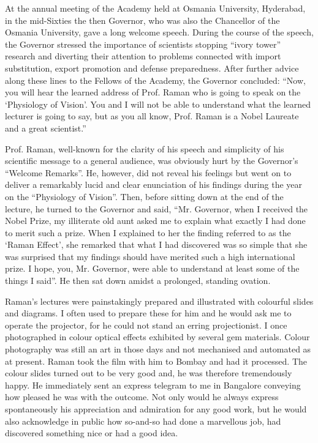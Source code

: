 At the annual meeting of the Academy held at Osmania University, Hyderabad, in the mid-Sixties the then Governor, who was also the Chancellor of the Osmania University, gave a long welcome speech. During the course of the speech, the Governor stressed the importance of scientists stopping ``ivory tower'' research and diverting their attention to problems connected with import substitution, export promotion and defense preparedness. After further advice along these lines to the Fellows of the Academy, the Governor concluded: ``Now, you will hear the learned address of Prof. Raman who is going to speak on the `Physiology of Vision'. You and I will not be able to understand what the learned lecturer is going to say, but as you all know, Prof. Raman is a Nobel Laureate and a great scientist.''

Prof. Raman, well-known for the clarity of his speech and simplicity of his scientific message to a general audience, was
obviously hurt by the Governor's ``Welcome Remarks''. He, however, did not reveal his feelings but went on to deliver a remarkably lucid and clear enunciation of his findings during the year on the ``Physiology of Vision''. Then, before sitting down at the end of the lecture, he turned to the Governor and said, ``Mr. Governor, when I received the Nobel Prize, my illiterate old aunt asked me to explain what exactly I had done to merit such a prize. When I explained to her the finding referred to as the `Raman Effect', she remarked that what I had discovered was so simple that she was surprised that my findings should have merited such a high international prize. I hope, you, Mr. Governor, were able to understand at least some of the things I said''. He then sat down amidst a prolonged, standing ovation.

Raman's lectures were painstakingly prepared and illustrated with colourful slides and diagrams. I often used to prepare these for him and he would ask me to operate the projector, for he could not stand an erring projectionist. I once photographed in colour optical effects exhibited by several gem materials. Colour photography was still an art in those days and not mechanised and automated as at present. Raman took the film with him to Bombay and had it processed. The colour slides turned out to be very good and, he was therefore tremendously happy. He immediately sent an express telegram to me in Bangalore conveying how pleased he was with the outcome. Not only would he always express spontaneously his appreciation and admiration for any good work, but he would also acknowledge in public how so-and-so had done a marvellous job, had discovered something nice or had a good idea.

